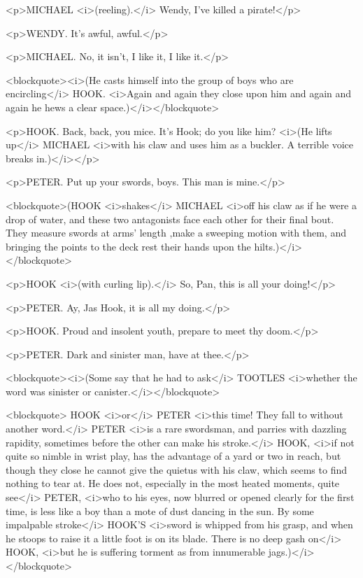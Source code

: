 <p>MICHAEL <i>(reeling).</i> Wendy, I've killed a pirate!</p>

<p>WENDY. It's awful, awful.</p>

<p>MICHAEL. No, it isn't, I like it, I like it.</p>

<blockquote><i>(He casts himself into the group of boys who are encircling</i> HOOK. <i>Again and again they close upon him and again and again he hews a clear space.)</i></blockquote>

<p>HOOK. Back, back, you mice. It's Hook; do you like him? <i>(He lifts up</i> MICHAEL <i>with his claw and uses him as a buckler. A terrible voice breaks in.)</i></p>

<p>PETER. Put up your swords, boys. This man is mine.</p>

<blockquote>(HOOK <i>shakes</i> MICHAEL <i>off his claw as if he were a drop of water, and these two antagonists face each other for their final bout. They measure swords at arms' length ,make a sweeping motion with them, and bringing the points to the deck rest their hands upon the hilts.)</i></blockquote>

<p>HOOK <i>(with curling lip).</i> So, Pan, this is all your doing!</p>

<p>PETER. Ay, Jas Hook, it is all my doing.</p>

<p>HOOK. Proud and insolent youth, prepare to meet thy doom.</p>

<p>PETER. Dark and sinister man, have at thee.</p>

<blockquote><i>(Some say that he had to ask</i> TOOTLES <i>whether the word was sinister or canister.</i></blockquote>

<blockquote> HOOK <i>or</i> PETER <i>this time! They fall to without another word.</i> PETER <i>is a rare swordsman, and parries with dazzling rapidity, sometimes before the other can make his stroke.</i> HOOK, <i>if not quite so nimble in wrist play, has the advantage of a yard or two in reach, but though they close he cannot give the quietus with his claw, which seems to find nothing to tear at. He does not, especially in the most heated moments, quite see</i> PETER, <i>who to his eyes, now blurred or opened clearly for the first time, is less like a boy than a mote of dust dancing in the sun. By some impalpable stroke</i> HOOK'S <i>sword is whipped from his grasp, and when he stoops to raise it a little foot is on its blade. There is no deep gash on</i> HOOK, <i>but he is suffering torment as from innumerable jags.)</i></blockquote>

